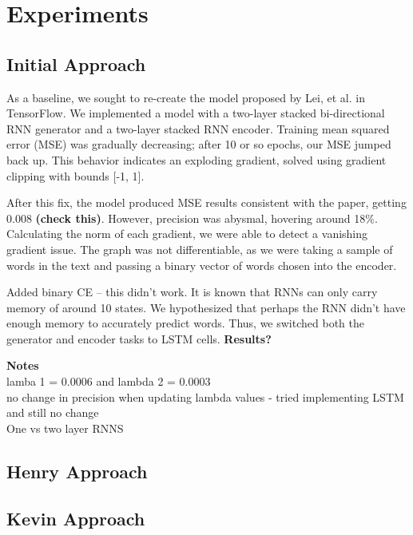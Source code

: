 \documentclass{article} %
\begin{document}
\section{Experiments}

\subsection{Initial Approach}

As a baseline, we sought to re-create the model proposed by Lei, et al. in
TensorFlow. We implemented a model with a two-layer stacked bi-directional RNN
generator and a two-layer stacked RNN encoder. Training mean squared error (MSE)
was gradually decreasing; after 10 or so epochs, our MSE jumped back up. This
behavior indicates an exploding gradient, solved using gradient clipping with
bounds [-1, 1].

After this fix, the model produced MSE results consistent with the paper,
getting 0.008 \textbf{(check this)}. However, precision was abysmal, hovering
around 18\%. Calculating the norm of each gradient, we were able to detect a
vanishing gradient issue. The graph was not differentiable, as we were taking a
sample of words in the text and passing a binary vector of words chosen into the
encoder.

Added binary CE -- this didn't work. It is known that RNNs can only carry memory
of around 10 states. We hypothesized that perhaps the RNN didn't have enough
memory to accurately predict words. Thus, we switched both the generator and
encoder tasks to LSTM cells. \textbf{Results?}




\textbf{Notes} \\

lamba 1 = 0.0006 and lambda 2 = 0.0003 \\

no change in precision when updating lambda values - tried implementing LSTM and still no change\\

One vs two layer RNNS \\

\subsection{Henry Approach}
\subsection{Kevin Approach}
\end{document}
